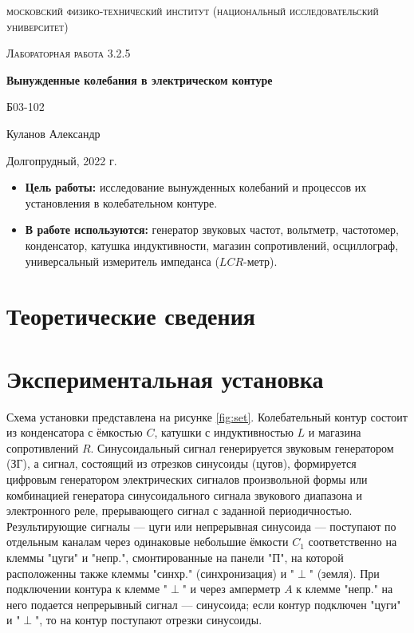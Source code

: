 \documentclass[a4paper, 12pt]{article}
\begin{document}
\begin{titlepage}
	\centering
	\vspace{5cm}
	{\scshape\LARGE московский физико-технический институт (национальный исследовательский университет) \par}
	\vspace{6cm}
	{\scshape\Large Лабораторная работа 3.2.5 \par}
	{\huge\bfseries Вынужденные колебания в электрическом контуре \par}
	\vspace{1cm}
	\vfill
\begin{flushright}
	{\large Б03-102}\par
	\vspace{0.3cm}
	{\LARGE Куланов Александр}
\end{flushright}
	

	\vfill


	Долгопрудный, 2022 г.
\end{titlepage}

\begin{itemize}
	\item \textbf{Цель работы:} исследование вынужденных колебаний и процессов их установления в колебательном контуре.
    \item \textbf{В работе используются:} генератор звуковых частот, вольтметр, частотомер, конденсатор, катушка индуктивности, магазин сопротивлений, осциллограф, универсальный измеритель импеданса ($LCR$-метр).
    
\end{itemize}



\section{Теоретические сведения}



\section{Экспериментальная установка}

Схема установки представлена на рисунке \ref{fig:set}. Колебательный контур состоит из конденсатора с ёмкостью
$C$, катушки с индуктивностью $L$ и магазина сопротивлений $R$. Синусоидальный сигнал генерируется звуковым
генератором (ЗГ), а сигнал, состоящий из отрезков синусоиды (цугов), формируется цифровым генератором электрических
сигналов произвольной формы или комбинацией генератора синусоидального сигнала звукового диапазона и электронного 
реле, прерывающего сигнал с заданной периодичностью. Результирующие сигналы --- цуги или непрерывная синусоида 
--- поступают по отдельным каналам через одинаковые небольшие ёмкости $C_1$ соответственно на клеммы "цуги" и "непр."{},
смонтированные на панели "П"{}, на которой расположенны также клеммы "синхр." (синхронизация) и "$\perp$" (земля).
При подключении контура к клемме "$\perp$"{} и через амперметр $A$ к клемме "непр."{} на него подается непрерывный
сигнал --- синусоида; если контур подключен "цуги"{} и "$\perp$"{}, то на контур поступают отрезки синусоиды. 
\end{document}
